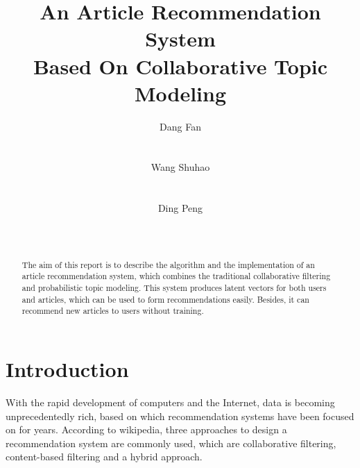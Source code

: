 \documentclass{acm_proc_article-sp}
\begin{document}
\title{An Article Recommendation System\\
Based On Collaborative Topic Modeling}

\author{
\alignauthor
Dang Fan\\
       \\
       \\
\alignauthor
Wang Shuhao\\
       \\
       \\
\alignauthor
Ding Peng\\
       \\
       \\
}

\maketitle
\begin{abstract}
The aim of this report is to describe the algorithm and the implementation of an article recommendation system, which combines the traditional collaborative filtering and probabilistic topic modeling. This system produces latent vectors for both users and articles, which can be used to form recommendations easily. Besides, it can recommend new articles to users without training.
\end{abstract}




\section{Introduction}
With the rapid development of computers and the Internet, data is becoming unprecedentedly rich, based on which recommendation systems have been focused on for years. According to wikipedia\cite{website:wiki}, three approaches to design a recommendation system are commonly used, which are collaborative filtering, content-based filtering and a hybrid approach.
\end{document}
